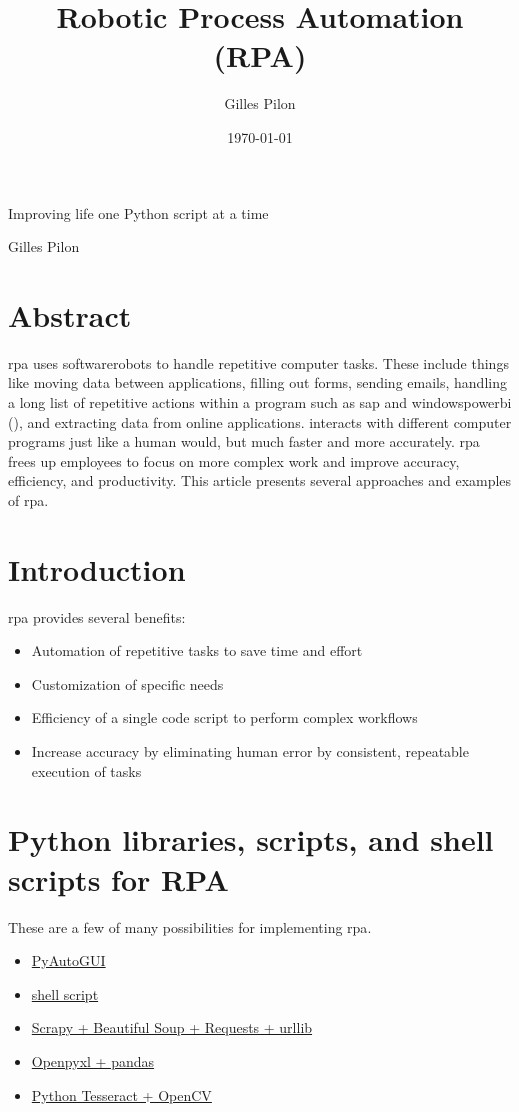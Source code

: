 \documentclass[10pt, letterpaper, twoside]{article}
\title{Robotic Process Automation (RPA)}
\author{Gilles Pilon}
\date{\today}
\begin{document}
\maketitle
\renewcommand{\epigraphflush}{flushleft}
\renewcommand{\textflush}{flushleft}
\renewcommand{\sourceflush}{flushleft}
\epigraph{Improving life one Python script at a time}{Gilles Pilon}
\section*{Abstract}
\Gls{rpa} uses \glspl{softwarerobot} to handle repetitive computer tasks. These include things like moving data between applications, filling out forms, sending emails, handling a long list of repetitive actions within a program such as \Gls{sap} and \Gls{windowspowerbi} (\cite{windowspowerbi}), and extracting data from online applications.  interacts with different computer programs just like a human would, but much faster and more accurately. \Gls{rpa} frees up employees to focus on more complex work and improve accuracy, efficiency, and productivity. This article presents several approaches and examples of \Gls{rpa}.

\newpage
\tableofcontents
\newpage
\section{Introduction}\label{sec:introduction}
\Gls{rpa} provides several benefits:
\begin{itemize}
    \item{Automation of repetitive tasks to save time and effort}
    \item{Customization of specific needs}
    \item{Efficiency of a single code script to perform complex workflows}
    \item{Increase accuracy by eliminating human error by consistent, repeatable execution of tasks}
\end{itemize}
\section{Python libraries, scripts, and shell scripts for RPA}\label{sec:python_libraries_scripts_shell_scripts_for_rpa}
These are a few of many possibilities for implementing \Gls{rpa}.
\begin{itemize}
\item \hyperref[sec:pyautogui]{PyAutoGUI}
\item \hyperref[sec:shell_script]{shell script}
\item \hyperref[sec:scrapy]{Scrapy + Beautiful Soup + Requests + urllib}
\item \hyperref[sec:openpyxl_pandas]{Openpyxl + pandas}
\item \hyperref[sec:pytesseract_opencv]{Python Tesseract + OpenCV}
\end{itemize}
\end{document}
